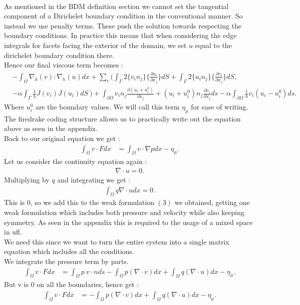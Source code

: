 \documentclass[11pt,twoside,a4paper]{article}
\begin{document}
\\
As mentioned in the BDM definition section we cannot set the tangential component of a Dirichelet boundary condition in the conventional manner.  So instead we use penalty terms. These push the solution towards respecting the boundary conditions. In practice this means that when considering the edge integrals for facets facing the exterior of the domain, we set $u$ equal to the dirichelet boundary condition there.\\
 Hence our final viscous term becomes :\\
\begin{align*}
&-  \int_\Omega \nabla_h(v) : \nabla_h(u) dx + \sum_e ( \int_\Gamma 2 \{ v_i n_j \} \{ \frac{\partial u_i}{\partial x_j}\} dS + \int_\Gamma 2 \{ u_i n_j \} \{ \frac{\partial v_i}{\partial x_j}\} dS, \\
&- \alpha \int_\Gamma \frac{1}{h}  J(v_i) J(u_i) dS \ ) + \int_{\partial  \Omega} v_i n_j \frac{\partial(u_i + u^0_i)}{\partial x_j} + (u_i + u^0_i) n_j\frac{\partial v_i}{\partial x_j} ds - \alpha \int_{\partial \Omega} \frac{1}{h} v_i(u_i-u^0_i)ds .
\end{align*}
Where $u^0_i$ are the boundary values.
We will call this term $\eta_\mu$ for ease of writing. The firedrake coding structure allows us to practically write out the equation above as seen in the appendix.\\
Back to our original equation we get :
\begin{align}
\int_\Omega v \cdot F dx &= \int_\Omega v \cdot \nabla p dx - \eta_\mu .
\end{align}
Let us consider the continuity equation again :
\begin{align*}
\nabla \cdot u = 0 .
\end{align*}
Multiplying by $q$ and integrating we get :
\begin{align*}
\int_\Omega q \nabla \cdot u dx = 0 .
\end{align*}
This is $0$, so we add this to the weak formulation $(3)$ we obtained, getting one weak formulation which includes both pressure and velocity while also keeping symmetry. As seen in the appendix this is required to the usage of a mixed space in ufl.\\
We need this since we want to turn the entire system into a single matrix equation which includes all the conditions.\\
We integrate the pressure term by parts.
\begin{align}
\int_\Omega v \cdot F dx &= \int_\Omega p \ v \cdot n ds - \int_\Omega  p ( \nabla \cdot v) dx + \int_\Omega q (\nabla \cdot u) dx  - \eta_\mu .
\end{align}
But v is $0$ on all the boundaries, hence get :
\begin{align}
\int_\Omega v \cdot F dx &= - \int_\Omega  p ( \nabla \cdot v) dx + \int_\Omega q (\nabla \cdot u) dx  - \eta_\mu .
\end{align}
\end{document}
